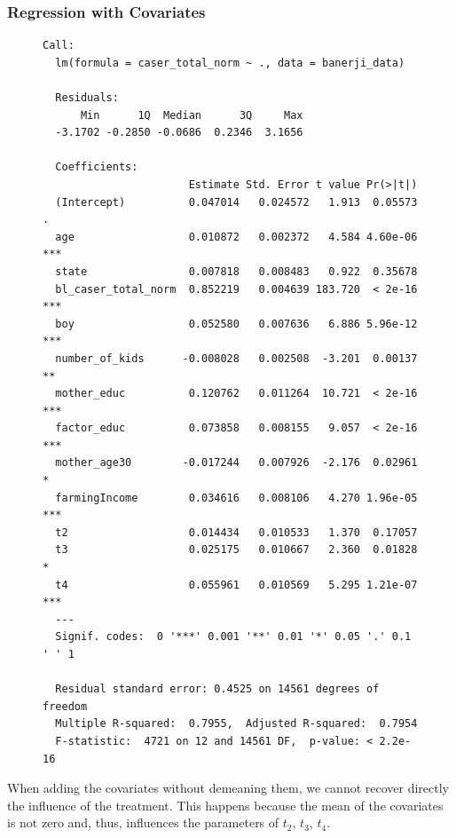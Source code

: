\documentclass{article}
\begin{document}
\subsubsection*{Regression with Covariates}
\begin{figure}[H]
\begin{lstlisting}[style=RstyleComment, caption=Regression with Covariates]
  Call:
  lm(formula = caser_total_norm ~ ., data = banerji_data)
  
  Residuals:
      Min      1Q  Median      3Q     Max 
  -3.1702 -0.2850 -0.0686  0.2346  3.1656 
  
  Coefficients:
                       Estimate Std. Error t value Pr(>|t|)    
  (Intercept)          0.047014   0.024572   1.913  0.05573 .  
  age                  0.010872   0.002372   4.584 4.60e-06 ***
  state                0.007818   0.008483   0.922  0.35678    
  bl_caser_total_norm  0.852219   0.004639 183.720  < 2e-16 ***
  boy                  0.052580   0.007636   6.886 5.96e-12 ***
  number_of_kids      -0.008028   0.002508  -3.201  0.00137 ** 
  mother_educ          0.120762   0.011264  10.721  < 2e-16 ***
  factor_educ          0.073858   0.008155   9.057  < 2e-16 ***
  mother_age30        -0.017244   0.007926  -2.176  0.02961 *  
  farmingIncome        0.034616   0.008106   4.270 1.96e-05 ***
  t2                   0.014434   0.010533   1.370  0.17057    
  t3                   0.025175   0.010667   2.360  0.01828 *  
  t4                   0.055961   0.010569   5.295 1.21e-07 ***
  ---
  Signif. codes:  0 '***' 0.001 '**' 0.01 '*' 0.05 '.' 0.1 ' ' 1
  
  Residual standard error: 0.4525 on 14561 degrees of freedom
  Multiple R-squared:  0.7955,	Adjusted R-squared:  0.7954 
  F-statistic:  4721 on 12 and 14561 DF,  p-value: < 2.2e-16
\end{lstlisting}
\end{figure}

When adding the covariates without demeaning them, we cannot recover directly the influence of the treatment. This happens because the mean of the covariates is not zero and, thus, influences the parameters of $t_2$, $t_3$, $t_4$.
\end{document}
